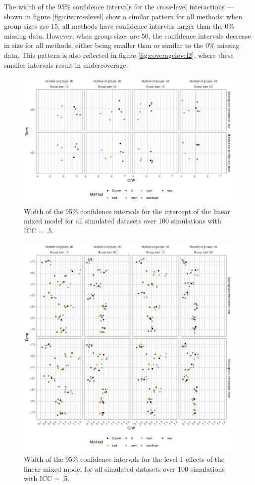 \documentclass[preprint,12pt]{elsarticle}
\begin{document}
The width of the 95\% confidence intervals for the cross-level interactions --- shown in figure \ref{fig:ciwcrosslevel} show a similar pattern for all methods: when group sizes are 15, all methods have confidence intervals larger than the 0\% missing data. However, when group sizes are 50, the confidence intervals decrease in size for all methods, either being smaller than or similar to the 0\% missing data. This pattern is also reflected in figure \ref{fig:coveragelevel2}, where these smaller intervals result in undercoverage.

\begin{figure}[H]
    \centering
    \includegraphics[width=1\textwidth]{ciwintercept.png}
    \caption{Width of the 95\% confidence intervals for the intercept of the linear mixed model for all simulated datasets over 100 simulations with ICC = .5.}
    \label{fig:ciwintercept}
\end{figure}

\begin{figure}[H]
    \centering
    \includegraphics[width=1\textwidth]{ciwlevel1.png}
    \caption{Width of the 95\% confidence intervals for the level-1 effects of the linear mixed model for all simulated datasets over 100 simulations with ICC = .5.}
    \label{fig:ciwlevel1}
\end{figure}
\end{document}
